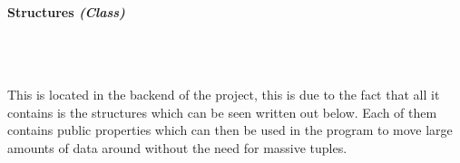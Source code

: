 \begin{FlushLeft}
    \pagebreak
\paragraph{Structures \textit{(Class)}} \mbox{} \\

    \begin{figure}[H]
        \centering
    \end{figure}\\

    This is located in the backend of the project, this is due to the fact that all it contains is the structures which can be seen written out below. Each of them contains public properties which can then be used in the program to move large amounts of data around without the need for massive tuples.

    \begin{figure}[H]
        \centering
    \end{figure}\\



\end{FlushLeft}

